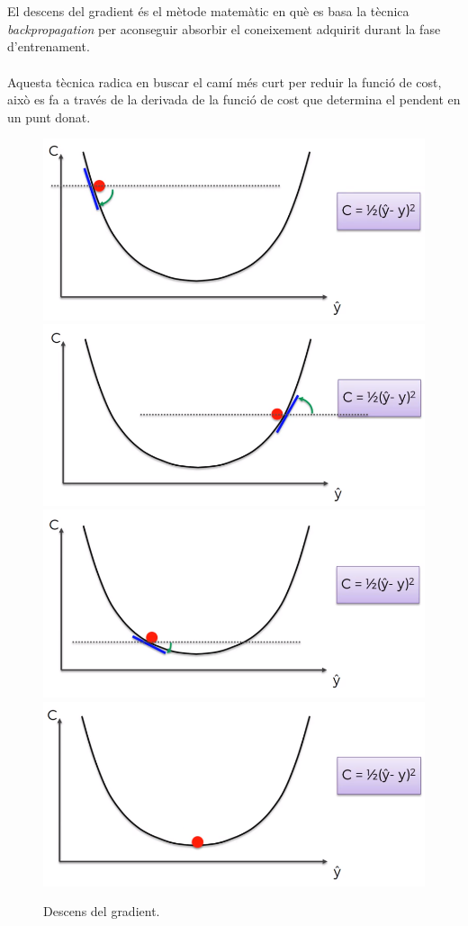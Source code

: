 \documentclass[12pt]{article}
\begin{document}
\\\\El descens del gradient és el mètode matemàtic en què es basa la tècnica \textit{backpropagation} per aconseguir absorbir el coneixement adquirit durant la fase d'entrenament. 
\\\\Aquesta tècnica radica en buscar el camí més curt per reduir la funció de cost, això es fa a través de la derivada de la funció de cost que determina el pendent en un punt donat.
\begin{figure}[h!]
	\includegraphics[scale=0.25]{imatges/dg/2dg2.png}
	\includegraphics[scale=0.25]{imatges/dg/3dg3.png}
	\includegraphics[scale=0.25]{imatges/dg/4dg4.png}
	\includegraphics[scale=0.25]{imatges/dg/5dg5.png}
	\caption{Descens del gradient.}
\end{figure}
\end{document}
